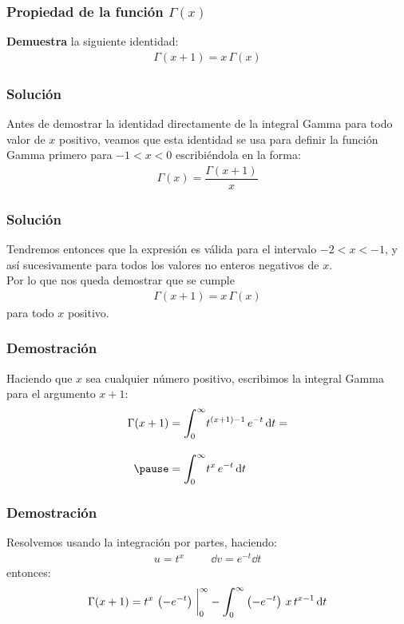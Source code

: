 \documentclass[12pt]{beamer}
\begin{document}
\begin{frame}
\frametitle{Propiedad de la función $\Gamma(x)$}
\textbf{Demuestra} la siguiente identidad:
\begin{align*}
\Gamma (x + 1) = x \, \Gamma (x)
\end{align*}
\end{frame}
\begin{frame}
\frametitle{Solución}
Antes de demostrar la identidad directamente de la integral Gamma para todo valor de $x$ positivo, veamos que esta identidad se usa para definir la función Gamma primero para $-1 < x < 0$ escribiéndola en la forma:
\begin{align*}
\Gamma(x) = \dfrac{\Gamma (x + 1)}{x}
\end{align*}
\end{frame}
\begin{frame}
\frametitle{Solución}
Tendremos entonces que la expresión es válida para el intervalo $-2 < x < -1$, y así sucesivamente para todos los valores no enteros negativos de $x$.
\\
\bigskip
\pause
Por lo que nos queda demostrar que se cumple
\begin{align*}
\Gamma (x + 1) =  x \, \Gamma (x)
\end{align*}
para todo $x$ positivo.
\end{frame}
\begin{frame}
\frametitle{Demostración}
Haciendo que $x$ sea cualquier número positivo, escribimos la integral Gamma para el argumento $x + 1$:
\begin{eqnarray*}
\Gamma (x + 1) &= \displaystyle \scaleint{6ex}_{\bs 0}^{\infty} t^{(x+1)-1} \, e^{-t} \dd{t} = \\[1em] \pause
&= \displaystyle \scaleint{6ex}_{\bs 0}^{\infty} t^{x} \, e^{-t} \dd{t}
\end{eqnarray*}
\end{frame}
\begin{frame}
\frametitle{Demostración}
Resolvemos usando la integración por partes, haciendo:
\pause
\begin{align*}
u = t^{x} \hspace{1cm} \dd{v} = e^{-t} \dd{t}
\end{align*}
entonces:
\pause
\begin{align*}
\Gamma (x + 1) = t^{x} \, \left( - e^{-t}\right)\eval_{0}^{\infty} - \scaleint{6ex}_{\bs 0}^{\infty} \left( -e^{-t}\right) \, x \, t^{x-1} \dd{t}
\end{align*}
\end{frame}
\end{document}
